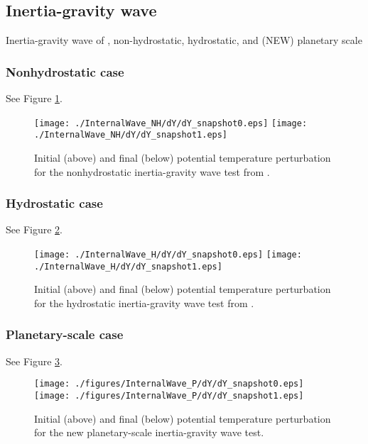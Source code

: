 \documentclass{ametsoc}
\theoremstyle{definition}
\begin{document}
\subsection{Inertia-gravity wave} 

Inertia-gravity wave of \cite{SkamarockKlemp1994}, non-hydrostatic, hydrostatic, and (NEW) planetary scale

\subsubsection{Nonhydrostatic case}

See Figure \ref{fig:SK94_NH}.

\begin{figure}
 \texttt{[image: ./InternalWave\_NH/dY/dY\_snapshot0.eps]}
 \texttt{[image: ./InternalWave\_NH/dY/dY\_snapshot1.eps]}
 \caption{Initial (above) and final (below) potential temperature perturbation for the nonhydrostatic inertia-gravity wave test from \cite{SkamarockKlemp1994}.}
 \label{fig:SK94_NH}
\end{figure}

\subsubsection{Hydrostatic case}

See Figure \ref{fig:SK94_H}.

\begin{figure}
 \texttt{[image: ./InternalWave\_H/dY/dY\_snapshot0.eps]}
 \texttt{[image: ./InternalWave\_H/dY/dY\_snapshot1.eps]}
 \caption{Initial (above) and final (below) potential temperature perturbation for the hydrostatic inertia-gravity wave test from \cite{SkamarockKlemp1994}.}
 \label{fig:SK94_H}
 \end{figure}

\subsubsection{Planetary-scale case}

See Figure \ref{fig:SK94_P}.

\begin{figure}
 \texttt{[image: ./figures/InternalWave\_P/dY/dY\_snapshot0.eps]}
 \texttt{[image: ./figures/InternalWave\_P/dY/dY\_snapshot1.eps]}
 \caption{Initial (above) and final (below) potential temperature perturbation for the new planetary-scale inertia-gravity wave test.}
  \label{fig:SK94_P}
\end{figure}
\end{document}
